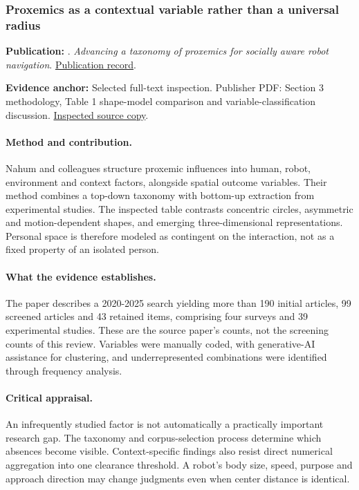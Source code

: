 \subsubsection{Proxemics as a contextual variable rather than a universal radius}\label{paper:proxemics2026}
\textbf{Publication:} \citet{proxemics2026}. \emph{Advancing a taxonomy of proxemics for socially aware robot navigation}. \href{https://doi.org/10.3389/frobt.2026.1800762}{Publication record}.

\textbf{Evidence anchor:} Selected full-text inspection. Publisher PDF: Section 3 methodology, Table 1 shape-model comparison and variable-classification discussion. \href{https://www.frontiersin.org/journals/robotics-and-ai/articles/10.3389/frobt.2026.1800762/pdf}{Inspected source copy}.

\paragraph{Method and contribution.} Nahum and colleagues structure proxemic influences into human, robot, environment and context factors, alongside spatial outcome variables. Their method combines a top-down taxonomy with bottom-up extraction from experimental studies. The inspected table contrasts concentric circles, asymmetric and motion-dependent shapes, and emerging three-dimensional representations. Personal space is therefore modeled as contingent on the interaction, not as a fixed property of an isolated person.

\paragraph{What the evidence establishes.} The paper describes a 2020-2025 search yielding more than 190 initial articles, 99 screened articles and 43 retained items, comprising four surveys and 39 experimental studies. These are the source paper's counts, not the screening counts of this review. Variables were manually coded, with generative-AI assistance for clustering, and underrepresented combinations were identified through frequency analysis.

\paragraph{Critical appraisal.} An infrequently studied factor is not automatically a practically important research gap. The taxonomy and corpus-selection process determine which absences become visible. Context-specific findings also resist direct numerical aggregation into one clearance threshold. A robot's body size, speed, purpose and approach direction may change judgments even when center distance is identical.

